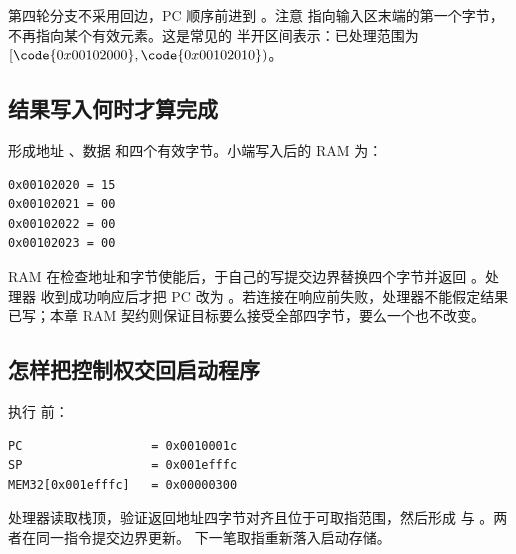 第四轮分支不采用回边，PC 顺序前进到 。注意
 指向输入区末端的第一个字节，不再指向某个有效元素。这是常见的
半开区间表示：已处理范围为
\([\code{0x00102000},\code{0x00102010})\)。

\subsection{结果写入何时才算完成}

 形成地址 、数据
 和四个有效字节。小端写入后的 RAM 为：

\begin{lstlisting}
0x00102020 = 15
0x00102021 = 00
0x00102022 = 00
0x00102023 = 00
\end{lstlisting}

RAM 在检查地址和字节使能后，于自己的写提交边界替换四个字节并返回 。处理器
收到成功响应后才把 PC 改为 。若连接在响应前失败，处理器不能假定结果
已写；本章 RAM 契约则保证目标要么接受全部四字节，要么一个也不改变。

\subsection{ 怎样把控制权交回启动程序}

执行  前：

\begin{lstlisting}
PC                  = 0x0010001c
SP                  = 0x001efffc
MEM32[0x001efffc]   = 0x00000300
\end{lstlisting}

处理器读取栈顶，验证返回地址四字节对齐且位于可取指范围，然后形成
 与 。两者在同一指令提交边界更新。
下一笔取指重新落入启动存储。

\begin{center}
\end{center}

